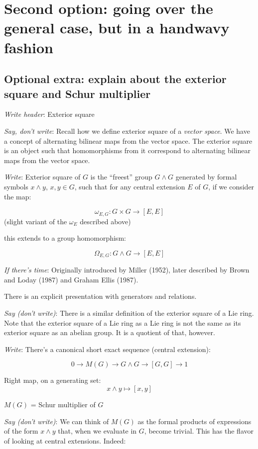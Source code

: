 \documentclass[10pt]{amsart}
\begin{document}
\section{Second option: going over the general case, but in a handwavy fashion}

\subsection{Optional extra: explain about the exterior square and Schur multiplier}

{\em Write header}: Exterior square

{\em Say, don't write}: Recall how we define exterior square of a {\em
  vector space}. We have a concept of alternating bilinear maps from
the vector space. The exterior square is an object such that
homomorphisms from it correspond to alternating bilinear maps from the
vector space.

{\em Write}: Exterior square of $G$ is the ``freest'' group $G \wedge G$
generated by formal symbols $x \wedge y$, $x,y \in G$, such that for
any central extension $E$ of $G$, if we consider the map:

$$\omega_{E,G}: G \times G \to [E,E]$$ (slight variant of the
$\omega_E$ described above)

this extends to a group homomorphism:

$$\Omega_{E,G}: G \wedge G \to [E,E]$$

{\em If there's time}: Originally introduced by Miller (1952), later
described by Brown and Loday (1987) and Graham Ellis (1987).

There is an explicit presentation with generators and relations.

{\em Say (don't write)}: There is a similar definition of the exterior
square of a Lie ring. Note that the exterior square of a Lie ring as a
Lie ring is not the same as its exterior square as an abelian
group. It is a quotient of that, however.

{\em Write}: There's a canonical short exact sequence (central extension):

$$0 \to M(G) \to G \wedge G \to [G,G] \to 1$$

Right map, on a generating set: $$x \wedge y \mapsto [x,y]$$

$M(G)$ = Schur multiplier of $G$

{\em Say (don't write)}: We can think of $M(G)$ as the formal products
of expressions of the form $x \wedge y$ that, when we evaluate in $G$,
become trivial. This has the flavor of looking at central extensions. Indeed:
\end{document}
